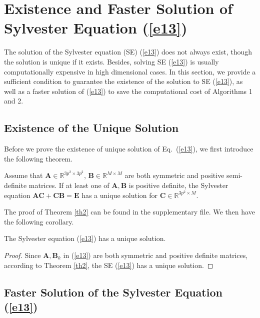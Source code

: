 \section{Existence and Faster Solution of Sylvester Equation (\ref{e13})}


The solution of the Sylvester equation (SE) (\ref{e13}) does not always exist, though the solution is unique if it exists. Besides, solving SE (\ref{e13}) is usually computationally expensive in high dimensional cases. In this section, we provide a sufficient condition to guarantee the existence of the solution to SE (\ref{e13}), as well as a faster solution of (\ref{e13}) to save the computational cost of Algorithms 1 and 2. 


\subsection{Existence of the Unique Solution}

Before we prove the existence of unique solution of Eq.\ (\ref{e13}), we first introduce the following theorem. 

\begin{theorem}
\label{th2}
Assume that $\bm{A}\in\mathbb{R}^{3p^2\times 3p^2}$, $\bm{B}\in\mathbb{R}^{M\times M}$ are both symmetric and positive semi-definite matrices. If at least one of $\bm{A}, \bm{B}$ is positive definite, the Sylvester equation $\bm{A}\bm{C}
+
\bm{C}\bm{B}
=
\bm{E}$ has a unique solution for $\bm{C}\in \mathbb{R}^{3p^2\times M}$.
\end{theorem}

The proof of Theorem \ref{th2} can be found in the supplementary file. We then have the following corollary.

\begin{corollary}
The Sylvester equation (\ref{e13}) has a unique solution.
\end{corollary}

\begin{proof}
Since $\bm{A},\bm{B}_{k}$ in (\ref{e13}) are both symmetric and positive definite matrices, according to Theorem \ref{th2}, the SE (\ref{e13}) has a unique solution. 
\end{proof}


\subsection{Faster Solution of the Sylvester Equation (\ref{e13})}

